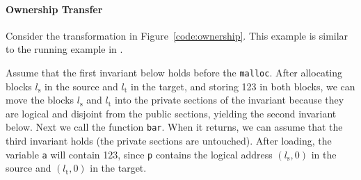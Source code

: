 \paragraph{Ownership Transfer}

Consider the transformation in Figure~\ref{code:ownership}.  This
example is similar to the running example in
.

Assume that the first invariant below holds before the \texttt{malloc}.  After
allocating blocks $l_\text{s}$ in the source and $l_\text{t}$ in
the target, and storing 123 in both blocks, we can move the blocks $l_\text{s}$
and $l_\text{t}$ into the private sections of the invariant because they are logical and disjoint from the
public sections, yielding the second invariant below. Next we call the function \texttt{bar}. When it
returns, we can assume that the third invariant holds (\ie the
private sections are untouched). After loading, the variable
\texttt{a} will contain 123, since \texttt{p} contains the
logical address $(l_\text{s},0)$ in the source and $(l_\text{t},0)$ in
the target. 

